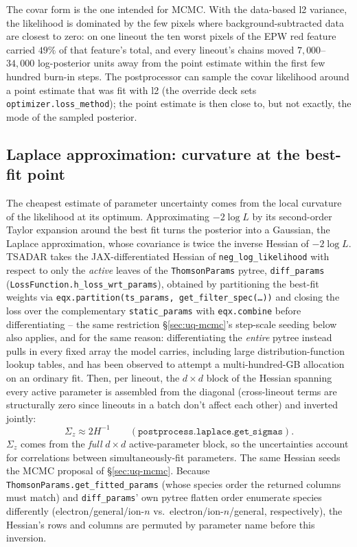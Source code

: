 \documentclass[11pt]{article}
\newcommand{\code}[1]{\texttt{#1}}
\begin{document}
The covar form is the one intended for MCMC. With the data-based l2 variance, the
likelihood is dominated by the few pixels where background-subtracted data are closest to
zero: on one lineout the ten worst pixels of the EPW red feature carried $49\%$ of that
feature's total, and every lineout's chains moved $7{,}000$--$34{,}000$ log-posterior
units away from the point estimate within the first few hundred burn-in steps. The
postprocessor can sample the covar likelihood around a point estimate that was fit with
l2 (the override deck sets \code{optimizer.loss\_method}); the point estimate is then
close to, but not exactly, the mode of the sampled posterior.

\subsection{Laplace approximation: curvature at the best-fit point}\label{sec:laplace}

The cheapest estimate of parameter uncertainty comes from the local curvature of the
likelihood at its optimum. Approximating $-2\log L$ by its second-order Taylor expansion
around the best fit turns the posterior into a Gaussian, the Laplace approximation, whose
covariance is twice the inverse Hessian of $-2\log L$. TSADAR
takes the JAX-differentiated Hessian of \code{neg\_log\_likelihood} with respect to only
the \emph{active} leaves of the \code{ThomsonParams} pytree, \code{diff\_params}
(\code{LossFunction.h\_loss\_wrt\_params}), obtained by partitioning the best-fit weights
via \code{eqx.partition(ts\_params, get\_filter\_spec(\ldots))} and closing the
loss over the complementary \code{static\_params} with \code{eqx.combine} before
differentiating -- the same restriction \S\ref{sec:uq-mcmc}'s step-scale seeding below also
applies, and for the same reason: differentiating the \emph{entire} pytree instead pulls in
every fixed array the model carries, including large distribution-function lookup tables,
and has been observed to attempt a multi-hundred-GB allocation on an ordinary fit. Then, per
lineout, the $d\times d$ block of the Hessian spanning every active parameter is assembled
from the diagonal (cross-lineout terms are structurally zero since lineouts in a batch don't
affect each other) and inverted jointly:
\begin{equation}
  \Sigma_z \approx 2H^{-1}
  \qquad(\code{postprocess.laplace.get\_sigmas}).
\end{equation}
$\Sigma_z$ comes from the \emph{full} $d\times d$ active-parameter block, so the
uncertainties account for correlations between simultaneously-fit parameters. The same
Hessian seeds the MCMC proposal of \S\ref{sec:uq-mcmc}. Because \code{ThomsonParams.get\_fitted\_params} (whose
species order the returned columns must match) and \code{diff\_params}' own pytree flatten
order enumerate species differently (electron/general/ion-$n$ vs.\ electron/ion-$n$/general,
respectively), the Hessian's rows and columns are permuted by parameter name before this
inversion.
\end{document}
